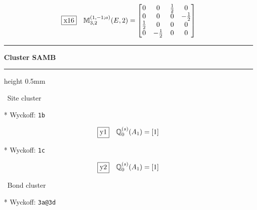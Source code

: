 \documentclass[fleqn,10pt,landscape]{jsarticle}
\begin{document}
\begin{dmath*}
\fbox{x16}\quad \mathbb{M}_{3,2}^{(1,-1;a)}(E,2)=\begin{bmatrix} 0 & 0 & \frac{1}{2} & 0 \\ 0 & 0 & 0 & - \frac{1}{2} \\ \frac{1}{2} & 0 & 0 & 0 \\ 0 & - \frac{1}{2} & 0 & 0 \end{bmatrix}
\end{dmath*}
\vspace{5mm}
\noindent \rule[0.5mm]{5mm}{0.5mm}\hspace{3mm}\textbf{Cluster SAMB}\hspace{3mm}\leaders\hrule height 0.5mm\hfill\kern0pt
\vspace{3mm}

\noindent\textbullet\, Site cluster

\vspace{5mm}

\noindent ** Wyckoff: \texttt{1b}

\begin{dmath*}
\fbox{y1}\quad \mathbb{Q}_{0}^{(s)}(A_{1})=\left[ 1 \right]
\end{dmath*}
\vspace{5mm}

\noindent ** Wyckoff: \texttt{1c}

\begin{dmath*}
\fbox{y2}\quad \mathbb{Q}_{0}^{(s)}(A_{1})=\left[ 1 \right]
\end{dmath*}
\vspace{5mm}

\noindent\textbullet\, Bond cluster

\vspace{5mm}

\noindent ** Wyckoff: \texttt{3a@3d}
\end{document}
